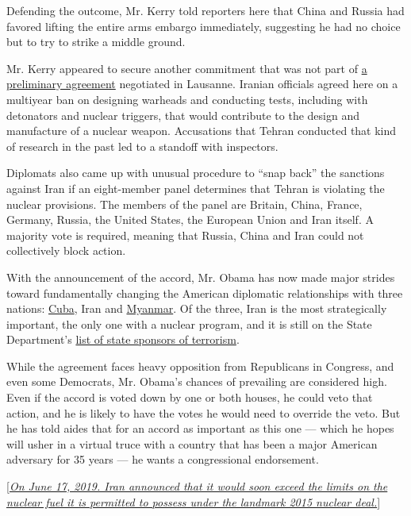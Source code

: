Defending the outcome, Mr. Kerry told reporters here that China and
Russia had favored lifting the entire arms embargo immediately,
suggesting he had no choice but to try to strike a middle ground.

Mr. Kerry appeared to secure another commitment that was not part of
\href{http://www.nytimes.com/2015/04/04/world/middleeast/an-iran-nuclear-deal-built-on-coffee-all-nighters-and-compromise.html}{a
preliminary agreement} negotiated in Lausanne. Iranian officials agreed
here on a multiyear ban on designing warheads and conducting tests,
including with detonators and nuclear triggers, that would contribute to
the design and manufacture of a nuclear weapon. Accusations that Tehran
conducted that kind of research in the past led to a standoff with
inspectors.

Diplomats also came up with unusual procedure to ``snap back'' the
sanctions against Iran if an eight-member panel determines that Tehran
is violating the nuclear provisions. The members of the panel are
Britain, China, France, Germany, Russia, the United States, the European
Union and Iran itself. A majority vote is required, meaning that Russia,
China and Iran could not collectively block action.

With the announcement of the accord, Mr. Obama has now made major
strides toward fundamentally changing the American diplomatic
relationships with three nations:
\href{http://www.nytimes.com/2014/12/18/world/americas/us-cuba-relations.html}{Cuba},
Iran and
\href{http://www.nytimes.com/2012/01/14/world/asia/united-states-resumes-diplomatic-relations-with-myanmar.html}{Myanmar}.
Of the three, Iran is the most strategically important, the only one
with a nuclear program, and it is still on the State Department's
\href{http://www.state.gov/j/ct/list/c14151.htm}{list of state sponsors
of terrorism}.

While the agreement faces heavy opposition from Republicans in Congress,
and even some Democrats, Mr. Obama's chances of prevailing are
considered high. Even if the accord is voted down by one or both houses,
he could veto that action, and he is likely to have the votes he would
need to override the veto. But he has told aides that for an accord as
important as this one --- which he hopes will usher in a virtual truce
with a country that has been a major American adversary for 35 years ---
he wants a congressional endorsement.

{[}\emph{\href{https://www.nytimes.com/2019/06/17/world/middleeast/iran-nuclear-deal-compliance.html}{On
June 17, 2019. Iran announced that it would soon exceed the limits on
the nuclear fuel it is permitted to possess under the landmark 2015
nuclear deal.}}{]}

